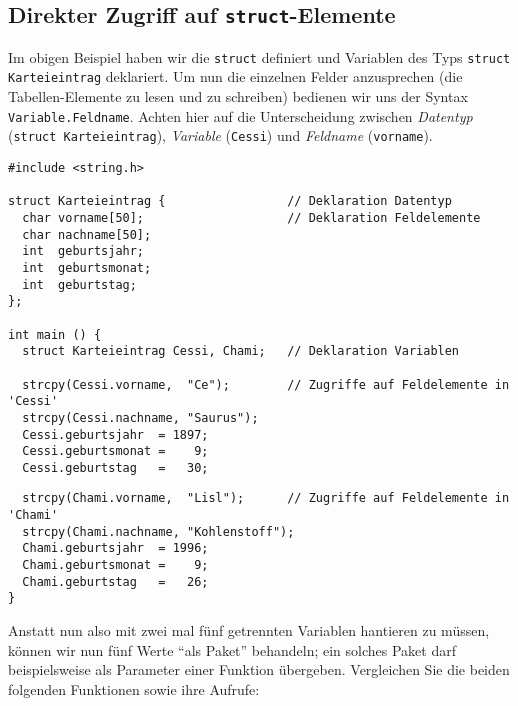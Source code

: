 
\subsection{Direkter Zugriff auf \texttt{struct}-Elemente}
Im obigen Beispiel haben wir die \texttt{struct} definiert und Variablen des Typs \texttt{struct Karteieintrag} deklariert. Um nun die einzelnen Felder anzusprechen (\ie die Tabellen-Elemente zu lesen und zu schreiben) bedienen wir uns der Syntax \texttt{Variable.Feldname}. Achten hier auf die Unterscheidung zwischen \emph{Datentyp} (\eg \texttt{struct Karteieintrag}), \emph{Variable} (\eg \texttt{Cessi}) und \emph{Feldname} (\eg \texttt{vorname}).

\begin{codebox}
\begin{verbatim}
#include <string.h>

struct Karteieintrag {                 // Deklaration Datentyp
  char vorname[50];                    // Deklaration Feldelemente
  char nachname[50];
  int  geburtsjahr;
  int  geburtsmonat;
  int  geburtstag;
};

int main () {
  struct Karteieintrag Cessi, Chami;   // Deklaration Variablen
  
  strcpy(Cessi.vorname,  "Ce");        // Zugriffe auf Feldelemente in 'Cessi'
  strcpy(Cessi.nachname, "Saurus");
  Cessi.geburtsjahr  = 1897;
  Cessi.geburtsmonat =    9;
  Cessi.geburtstag   =   30;
\end{verbatim}
\end{codebox}
\begin{codebox}[]
\begin{verbatim}
  strcpy(Chami.vorname,  "Lisl");      // Zugriffe auf Feldelemente in 'Chami'
  strcpy(Chami.nachname, "Kohlenstoff");
  Chami.geburtsjahr  = 1996;
  Chami.geburtsmonat =    9;
  Chami.geburtstag   =   26;
}
\end{verbatim}
\end{codebox}

Anstatt nun also mit zwei mal fünf getrennten Variablen hantieren zu müssen, können wir nun fünf Werte \enquote{als Paket} behandeln; ein solches Paket darf beispielsweise als Parameter einer Funktion übergeben. Vergleichen Sie die beiden folgenden Funktionen sowie ihre Aufrufe:

